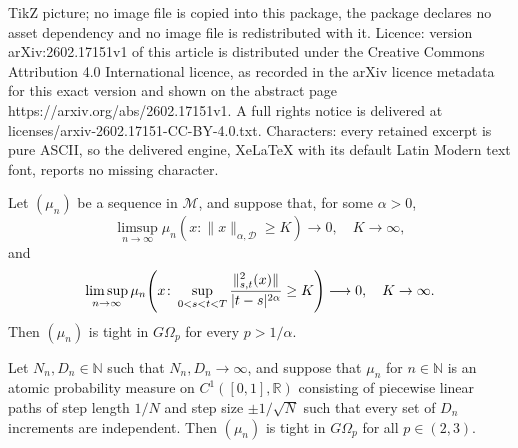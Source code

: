 \documentclass[10pt,a4paper]{amsart}
\let\sig\relax
\DeclareMathOperator{\sig}{S}
\newcommand{\N}{\mathbb{N}}
\newcommand{\R}{\mathbb{R}}
\begin{document}
TikZ picture; no image file is copied into this package, the package declares no asset dependency and no image file is redistributed with it. Licence: version arXiv:2602.17151v1 of this article is distributed under the Creative Commons Attribution 4.0 International licence, as recorded in the arXiv licence metadata for this exact version and shown on the abstract page https://arxiv.org/abs/2602.17151v1. A full rights notice is delivered at licenses/arxiv-2602.17151-CC-BY-4.0.txt. Characters: every retained excerpt is pure ASCII, so the delivered engine, XeLaTeX with its default Latin Modern text font, reports no missing character.
\begin{lemma}\label{lem:tightness}
    Let $(\mu_n)$ be a sequence in $\mathcal{M}$, and suppose that, for some $\alpha > 0$,
    \begin{equation}\label{eq: tightness condition 1}
    \limsup_{n\to \infty} \mu_n(x\colon \|x\|_{\alpha,\mathcal{D}} \ge K) \longrightarrow 0,\quad K \to \infty,
    \end{equation}
    and 
    \begin{equation}\label{eq: tightness condition 2}
    \limsup_{n\to \infty} \mu_n\Bigg(x\colon \sup_{0 < s < t < T} \frac{\| \sig^2_{s,t}(x) \|}{|t-s|^{2\alpha}} \ge K\Bigg) \longrightarrow 0,\quad K \to \infty.
    \end{equation}
    Then $(\mu_n)$ is tight in $G\Omega_p$ for every $p > 1 / \alpha$.
\end{lemma}

\begin{lemma}\label{lem:tightness OA}
    Let $N_n, D_n\in \N$ such that $N_n , D_n \to \infty$, and suppose that $\mu_n$ for $n\in \N$ is an atomic probability measure on $C^1([0,1],\R)$ consisting of piecewise linear paths of step length $1 / N$ and step size $\pm 1 / \sqrt{N}$ such that every set of $D_n$ increments are independent. Then $(\mu_n)$ is tight in $G\Omega_p$ for all $p\in(2,3)$.
\end{lemma}
\end{document}
